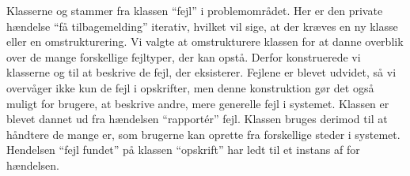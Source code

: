 Klasserne  og  stammer fra klassen ``fejl'' i problemområdet. Her er den private hændelse ``få tilbagemelding'' iterativ, hvilket vil sige, at der kræves en ny klasse eller en omstrukturering. Vi valgte at omstrukturere klassen for at danne overblik over de mange forskellige fejltyper, der kan opstå. Derfor konstruerede vi klasserne  og  til at beskrive de fejl, der eksisterer. Fejlene er blevet udvidet, så vi overvåger ikke kun de fejl i opskrifter, men denne konstruktion gør det også muligt for brugere, at beskrive andre, mere generelle fejl i systemet. Klassen  er blevet dannet ud fra hændelsen ``rapport\'{e}r'' fejl. Klassen  bruges derimod til at håndtere de mange er, som brugerne kan oprette fra forskellige steder i systemet. Hendelsen ``fejl fundet'' på klassen ``opskrift'' har \fx ledt til et instans af  for hændelsen.
